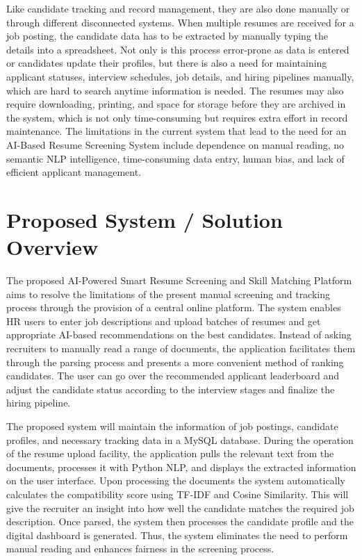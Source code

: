 \documentclass[12pt,a4paper]{report}
\begin{document}
Like candidate tracking and record management, they are also done manually or through different disconnected systems. When multiple resumes are received for a job posting, the candidate data has to be extracted by manually typing the details into a spreadsheet. Not only is this process error-prone as data is entered or candidates update their profiles, but there is also a need for maintaining applicant statuses, interview schedules, job details, and hiring pipelines manually, which are hard to search anytime information is needed. The resumes may also require downloading, printing, and space for storage before they are archived in the system, which is not only time-consuming but requires extra effort in record maintenance. The limitations in the current system that lead to the need for an AI-Based Resume Screening System include dependence on manual reading, no semantic NLP intelligence, time-consuming data entry, human bias, and lack of efficient applicant management.

\section{Proposed System / Solution Overview}

The proposed AI-Powered Smart Resume Screening and Skill Matching Platform aims to resolve the limitations of the present manual screening and tracking process through the provision of a central online platform. The system enables HR users to enter job descriptions and upload batches of resumes and get appropriate AI-based recommendations on the best candidates. Instead of asking recruiters to manually read a range of documents, the application facilitates them through the parsing process and presents a more convenient method of ranking candidates. The user can go over the recommended applicant leaderboard and adjust the candidate status according to the interview stages and finalize the hiring pipeline.

The proposed system will maintain the information of job postings, candidate profiles, and necessary tracking data in a MySQL database. During the operation of the resume upload facility, the application pulls the relevant text from the documents, processes it with Python NLP, and displays the extracted information on the user interface. Upon processing the documents the system automatically calculates the compatibility score using TF-IDF and Cosine Similarity. This will give the recruiter an insight into how well the candidate matches the required job description. Once parsed, the system then processes the candidate profile and the digital dashboard is generated. Thus, the system eliminates the need to perform manual reading and enhances fairness in the screening process.
\end{document}

